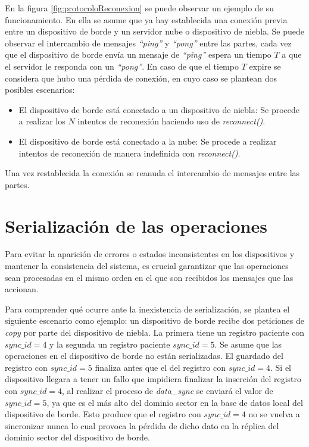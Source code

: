 En la figura \ref{fig:protocoloReconexion} se puede observar un ejemplo de su funcionamiento. En ella se asume que ya hay establecida una conexión previa entre un dispositivo de borde y un servidor nube o dispositivo de niebla. Se puede observar el intercambio de mensajes \textit{``ping''} y \textit{``pong''} entre las partes, cada vez que el dispositivo de borde envía un mensaje de \textit{``ping''} espera un tiempo $T$ a que el servidor le responda con un \textit{``pong''}. En caso de que el tiempo $T$ expire se considera que hubo una pérdida de conexión, en cuyo caso se plantean dos posibles escenarios:
\begin{itemize}
    \item El dispositivo de borde está conectado a un dispositivo de niebla: Se procede a realizar los $N$ intentos de reconexión haciendo uso de \textit{reconnect()}.
    \item El dispositivo de borde está conectado a la nube: Se procede a realizar intentos de reconexión de manera indefinida con \textit{reconnect()}.
\end{itemize}

Una vez restablecida la conexión se reanuda el intercambio de mensajes entre las partes.





\section{Serialización de las operaciones}
\label{sec:serializacion}
Para evitar la aparición de errores o estados inconsistentes en los dispositivos y mantener la consistencia del sistema, es crucial garantizar que las operaciones sean procesadas en el mismo orden en el que son recibidos los mensajes que las accionan.

Para comprender qué ocurre ante la inexistencia de serialización, se plantea el siguiente escenario como ejemplo: un dispositivo de borde recibe dos peticiones de \textit{copy} por parte del dispositivo de niebla. La primera tiene un registro paciente con $sync\_id=4$ y la segunda un registro paciente $sync\_id=5$. Se asume que las operaciones en el dispositivo de borde no están serializadas. El guardado del registro con $sync\_id=5$ finaliza antes que el del registro con $sync\_id=4$. Si el dispositivo llegara a tener un fallo que impidiera finalizar la inserción del registro con $sync\_id=4$, al realizar el proceso de \textit{data\_sync} se enviará el valor de $sync\_id=5$, ya que es el más alto del dominio sector en la base de datos local del dispositivo de borde. Esto produce que el registro con $sync\_id=4$ no se vuelva a sincronizar nunca lo cual provoca la pérdida de dicho dato en la réplica del dominio sector del dispositivo de borde.

